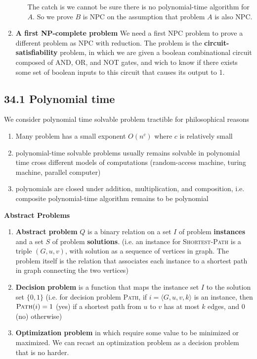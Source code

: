 \documentclass[11pt]{article}
\begin{document}
\begin{defn*}
\begin{enumerate}
\begin{enumerate}
            The catch is we cannot be sure there is no polynomial-time algorithm for $A$. So we prove $B$ is NPC on the assumption that problem $A$ is also NPC.
        \end{enumerate}
        \item \textbf{A first NP-complete problem}
        We need a first NPC problem to prove a different problem as NPC with reduction. The problem is the \textbf{circuit-satisfiability} problem, in which we are given a boolean combinational circuit composed of AND, OR, and NOT gates, and wich to know if there exists some set of boolean inputs to this circuit that causes its output to 1.
    \end{enumerate}
\end{defn*}


\subsection*{34.1 Polynomial time}


\begin{defn*}
    We consider polynomial time solvable problem tractible for philosophical reasons
    \begin{enumerate}
        \item Many problem has a small exponent $O(n^c)$ where $c$ is relatively small
        \item polynomial-time solvable problems usually remains solvable in polynomial time cross different models of computations (random-access machine, turing machine, parallel computer)
        \item polynomials are closed under addition, multiplication, and composition, i.e. composite polynomial-time algorithm remains to be polynomial
    \end{enumerate}
\end{defn*}

\begin{defn*}
    \textbf{Abstract Problems} 
    \begin{enumerate}
        \item \textbf{Abstract problem} $Q$ is a binary relation on a set $I$ of problem \textbf{instances} and a set $S$ of problem \textbf{solutions}. (i.e. an instance for \textsc{Shortest-Path} is a triple $(G, u, v)$, with solution as a sequence of vertices in graph. The problem itself is the relation that associates each instance to a shortest path in graph connecting the two vertices)
        \item \textbf{Decision problem} is a function that maps the instance set $I$ to the solution set $\{ 0, 1\}$ (i.e. for decision problem \textsc{Path}, if $i = \langle G, u, v, k \rangle$ is an instance, then $\textsc{Path}(i) = 1$ (yes) if a shortest path from $u$ to $v$ has at most $k$ edges, and $0$ (no) otherwise)
        \item \textbf{Optimization problem} in which require some value to be minimized or maximized. We can recast an optimization problem as a decision problem that is no harder.
    \end{enumerate}
\end{defn*}
\end{document}
